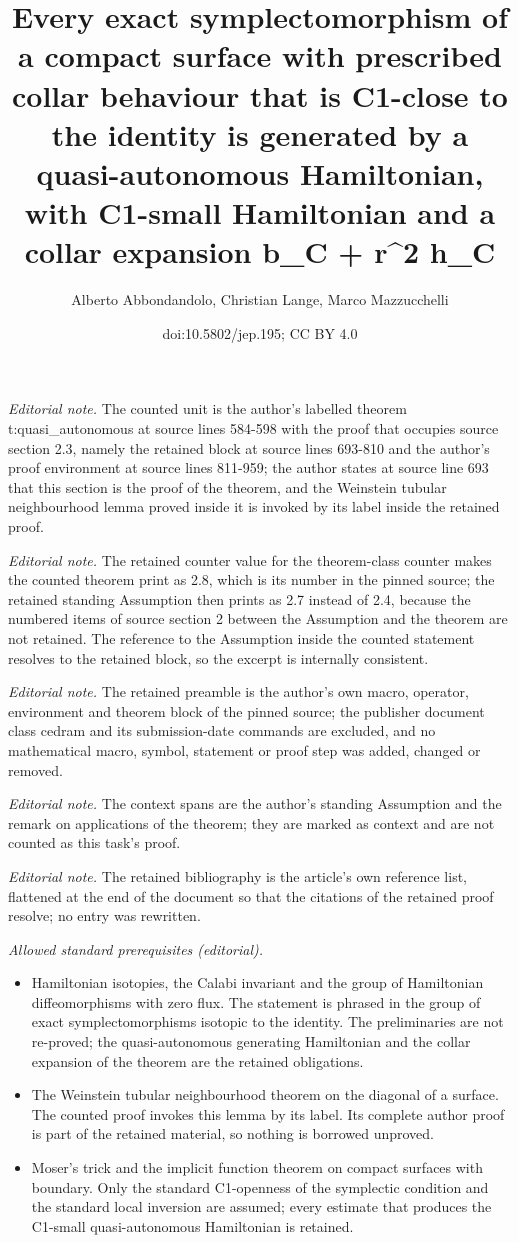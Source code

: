 \documentclass[10pt,a4paper]{article}
\title{Every exact symplectomorphism of a compact surface with prescribed collar behaviour that is C1-close to the identity is generated by a quasi-autonomous Hamiltonian, with C1-small Hamiltonian and a collar expansion b\_C + r\textasciicircum{}2 h\_C}
\author{Alberto Abbondandolo, Christian Lange, Marco Mazzucchelli}
\date{doi:10.5802/jep.195; CC BY 4.0}
\theoremstyle{definition}
\begin{document}
\maketitle
\setcounter{section}{2}
\setcounter{subsection}{2}
\setcounter{thm}{6}
\noindent\textit{Editorial note.} The counted unit is the author's labelled theorem t:quasi\_autonomous at source lines 584-598 with the proof that occupies source section 2.3, namely the retained block at source lines 693-810 and the author's proof environment at source lines 811-959; the author states at source line 693 that this section is the proof of the theorem, and the Weinstein tubular neighbourhood lemma proved inside it is invoked by its label inside the retained proof.\par\medskip
\noindent\textit{Editorial note.} The retained counter value for the theorem-class counter makes the counted theorem print as 2.8, which is its number in the pinned source; the retained standing Assumption then prints as 2.7 instead of 2.4, because the numbered items of source section 2 between the Assumption and the theorem are not retained. The reference to the Assumption inside the counted statement resolves to the retained block, so the excerpt is internally consistent.\par\medskip
\noindent\textit{Editorial note.} The retained preamble is the author's own macro, operator, environment and theorem block of the pinned source; the publisher document class cedram and its submission-date commands are excluded, and no mathematical macro, symbol, statement or proof step was added, changed or removed.\par\medskip
\noindent\textit{Editorial note.} The context spans are the author's standing Assumption and the remark on applications of the theorem; they are marked as context and are not counted as this task's proof.\par\medskip
\noindent\textit{Editorial note.} The retained bibliography is the article's own reference list, flattened at the end of the document so that the citations of the retained proof resolve; no entry was rewritten.\par\medskip
\noindent\textit{Allowed standard prerequisites (editorial).}\begin{itemize}
\item Hamiltonian isotopies, the Calabi invariant and the group of Hamiltonian diffeomorphisms with zero flux. The statement is phrased in the group of exact symplectomorphisms isotopic to the identity. The preliminaries are not re-proved; the quasi-autonomous generating Hamiltonian and the collar expansion of the theorem are the retained obligations.
\item The Weinstein tubular neighbourhood theorem on the diagonal of a surface. The counted proof invokes this lemma by its label. Its complete author proof is part of the retained material, so nothing is borrowed unproved.
\item Moser's trick and the implicit function theorem on compact surfaces with boundary. Only the standard C1-openness of the symplectic condition and the standard local inversion are assumed; every estimate that produces the C1-small quasi-autonomous Hamiltonian is retained.
\end{itemize}\medskip
\end{document}
